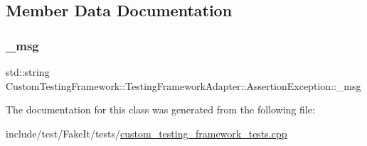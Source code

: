 \subsection{Member Data Documentation}
\mbox{\label{classCustomTestingFramework_1_1TestingFrameworkAdapter_1_1AssertionException_ae7e5ceab1ae1c2c80391819342c3e044}} 
\subsubsection{\texorpdfstring{\_msg}{\_msg}}
{\footnotesize\ttfamily std\+::string Custom\+Testing\+Framework\+::\+Testing\+Framework\+Adapter\+::\+Assertion\+Exception\+::\+\_\+msg}



The documentation for this class was generated from the following file\+:\begin{DoxyCompactItemize}
\item 
include/test/\+Fake\+It/tests/\mbox{\hyperlink{custom__testing__framework__tests_8cpp}{custom\+\_\+testing\+\_\+framework\+\_\+tests.\+cpp}}\end{DoxyCompactItemize}
